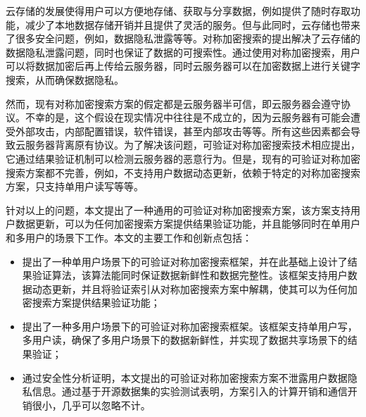 \begin{cabstract}
  云存储的发展使得用户可以方便地存储、获取与分享数据，例如提供了随时存取功能，减少了本地数据存储开销并且提供了灵活的服务。但与此同时，云存储也带来了很多安全问题，例如，数据隐私泄露等等。对称加密搜索的提出解决了云存储的数据隐私泄露问题，同时也保证了数据的可搜索性。通过使用对称加密搜索，用户可以将数据加密后再上传给云服务器，同时云服务器可以在加密数据上进行关键字搜索，从而确保数据隐私。

  然而，现有对称加密搜索方案的假定都是云服务器半可信，即云服务器会遵守协议。不幸的是，这个假设在现实情况中往往是不成立的，因为云服务器有可能会遭受外部攻击，内部配置错误，软件错误，甚至内部攻击等等。所有这些因素都会导致云服务器背离原有协议。为了解决该问题，可验证对称加密搜索技术相应提出，它通过结果验证机制可以检测云服务器的恶意行为。但是，现有的可验证对称加密搜索方案都不完善，例如，不支持用户数据动态更新，依赖于特定的对称加密搜索方案，只支持单用户读写等等。

  针对以上的问题，本文提出了一种通用的可验证对称加密搜索方案，该方案支持用户数据更新，可以为任何加密搜索方案提供结果验证功能，并且能够同时在单用户和多用户的场景下工作。本文的主要工作和创新点包括：

  \begin{itemize}
    \item 提出了一种单用户场景下的可验证对称加密搜索框架，并在此基础上设计了结果验证算法，该算法能同时保证数据新鲜性和数据完整性。该框架支持用户数据动态更新，并且将验证索引从对称加密搜索方案中解耦，使其可以为任何加密搜索方案提供结果验证功能；
    \item 提出了一种多用户场景下的可验证对称加密搜索框架。该框架支持单用户写，多用户读，确保了多用户场景下的数据新鲜性，并实现了数据共享场景下的结果验证；
    \item 通过安全性分析证明，本文提出的可验证对称加密搜索方案不泄露用户数据隐私信息。通过基于开源数据集的实验测试表明，方案引入的计算开销和通信开销很小，几乎可以忽略不计。
  \end{itemize}

\end{cabstract}


